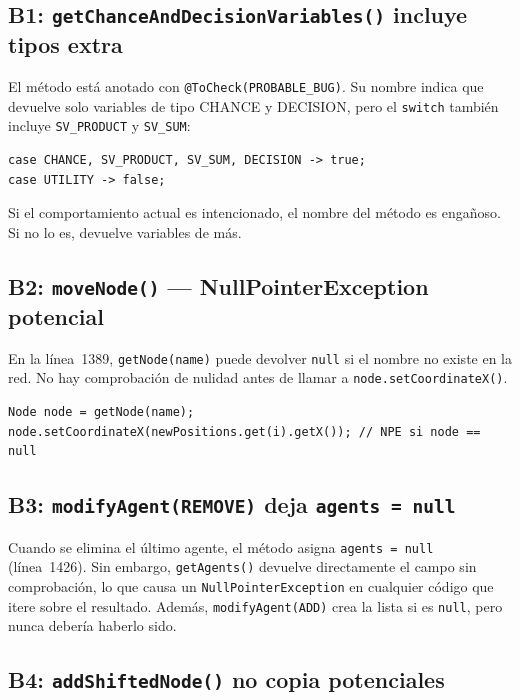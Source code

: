 \documentclass[11pt,a4paper]{article}
\newcommand{\code}[1]{\texttt{#1}}
\begin{document}
\subsection{B1: \code{getChanceAndDecisionVariables()} incluye tipos extra}

El m\'etodo est\'a anotado con \code{@ToCheck(PROBABLE\_BUG)}.  Su
nombre indica que devuelve solo variables de tipo CHANCE y DECISION,
pero el \code{switch} tambi\'en incluye \code{SV\_PRODUCT} y
\code{SV\_SUM}:

\begin{lstlisting}
case CHANCE, SV_PRODUCT, SV_SUM, DECISION -> true;
case UTILITY -> false;
\end{lstlisting}

Si el comportamiento actual es intencionado, el nombre del m\'etodo es
enga\~noso.  Si no lo es, devuelve variables de m\'as.

\subsection{B2: \code{moveNode()} --- NullPointerException potencial}

En la l\'inea~1389, \code{getNode(name)} puede devolver \code{null}
si el nombre no existe en la red.  No hay comprobaci\'on de nulidad
antes de llamar a \code{node.setCoordinateX()}.

\begin{lstlisting}
Node node = getNode(name);
node.setCoordinateX(newPositions.get(i).getX()); // NPE si node == null
\end{lstlisting}

\subsection{B3: \code{modifyAgent(REMOVE)} deja \code{agents = null}}

Cuando se elimina el \'ultimo agente, el m\'etodo asigna
\code{agents = null} (l\'inea~1426).  Sin embargo, \code{getAgents()}
devuelve directamente el campo sin comprobaci\'on, lo que causa un
\code{NullPointerException} en cualquier c\'odigo que itere sobre el
resultado.  Adem\'as, \code{modifyAgent(ADD)} crea la lista si es
\code{null}, pero nunca deber\'ia haberlo sido.

\subsection{B4: \code{addShiftedNode()} no copia potenciales}
\end{document}

